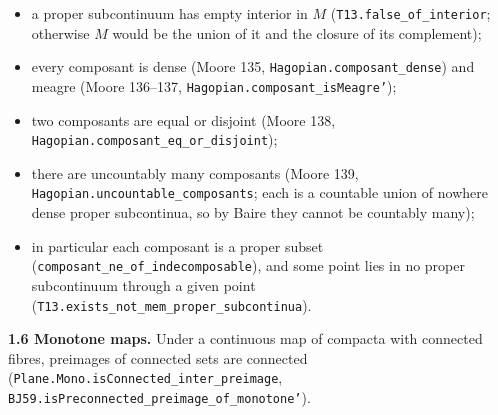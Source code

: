 \documentclass[11pt]{article}
\newcommand{\lean}[1]{\texttt{#1}}
\begin{document}
\begin{itemize}
  \item a proper subcontinuum has empty interior in $M$ (\lean{T13.\hspace{0pt}false\_\hspace{0pt}of\_\hspace{0pt}interior}; otherwise $M$ would be the union of it and the closure of its complement);
  \item every composant is dense (Moore 135, \lean{Hagopian.\hspace{0pt}composant\_\hspace{0pt}dense}) and meagre (Moore 136--137, \lean{Hagopian.\hspace{0pt}composant\_\hspace{0pt}isMeagre'});
  \item two composants are equal or disjoint (Moore 138, \lean{Hagopian.\hspace{0pt}composant\_\hspace{0pt}eq\_\hspace{0pt}or\_\hspace{0pt}disjoint});
  \item there are uncountably many composants (Moore 139, \lean{Hagopian.\hspace{0pt}uncountable\_\hspace{0pt}composants}; each is a countable union of nowhere dense proper subcontinua, so by Baire they cannot be countably many);
  \item in particular each composant is a proper subset (\lean{composant\_\hspace{0pt}ne\_\hspace{0pt}of\_\hspace{0pt}indecomposable}), and some point lies in no proper subcontinuum through a given point (\lean{T13.\hspace{0pt}exists\_\hspace{0pt}not\_\hspace{0pt}mem\_\hspace{0pt}proper\_\hspace{0pt}subcontinua}).
\end{itemize}

\textbf{1.6 Monotone maps.} Under a continuous map of compacta with connected fibres, preimages of connected sets are connected (\lean{Plane.\hspace{0pt}Mono.\hspace{0pt}isConnected\_\hspace{0pt}inter\_\hspace{0pt}preimage}, \lean{BJ59.\hspace{0pt}isPreconnected\_\hspace{0pt}preimage\_\hspace{0pt}of\_\hspace{0pt}monotone'}).
\end{document}
